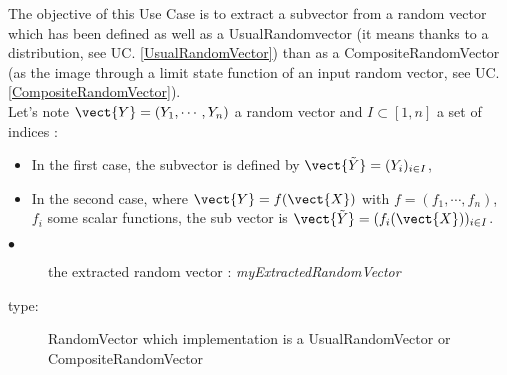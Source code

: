 \renewcommand{\filename}{docUC_OVI_RVExtraction.tex}
\renewcommand{\filetitle}{UC : Extraction of a random subvector from a random vector}

\HeaderIIILevel



The objective of this Use Case is to extract a subvector from a random vector which has been defined as well  as a UsualRandomvector (it means thanks to a distribution, see UC. \ref{UsualRandomVector}) than  as a CompositeRandomVector (as the image through a limit state function of an input  random vector, see UC. \ref{CompositeRandomVector}).\\

Let's note $\vect{Y} = (Y_1, \cdots, Y_n)$ a random vector and $I \subset [1, n]$ a set of indices :
\begin{itemize}
\item In the first case, the subvector is defined by $\vect{\tilde{Y}} = (Y_i)_{i \in I}$,
\item In the second case, where $\vect{Y} = f(\vect{X})$ with $f = (f_1, \cdots, f_n)$, $f_i$ some scalar functions, the sub vector is $\vect{\tilde{Y}} = (f_i(\vect{X}))_{i \in I}$.
\end{itemize}


\noindent%
             {
               \begin{description}
               \item[$\bullet$] the extracted random vector : {\itshape myExtractedRandomVector}
               \item[type:] RandomVector which implementation is a UsualRandomVector or CompositeRandomVector
               \end{description}
             }

